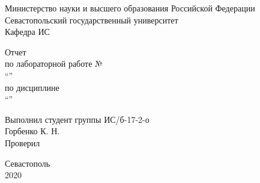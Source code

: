 \begin{titlepage}
    
    \thispagestyle{empty}
    
    \begin{center}
        
        Министерство науки и высшего образования Российской Федерации \\
        Севастопольский государственный университет \\
        Кафедра ИС
        
        \vfill

        Отчет \\
        по лабораторной работе №\mylabnumber \\
        \enquote{\mylabtitle} \\
        по дисциплине \\
        \enquote{\MakeTextUppercase{\mysubject}}

    \end{center}

    \vspace{1cm}

    \noindent\hspace{7.5cm} Выполнил студент группы ИС/б-17-2-о \\
    \null\hspace{7.5cm} Горбенко К. Н. \\
    \null\hspace{7.5cm} Проверил \\
    \null\hspace{7.5cm} \mylecturer

    \vfill

    \begin{center}
        Севастополь \\
        2020
    \end{center}

\end{titlepage}
